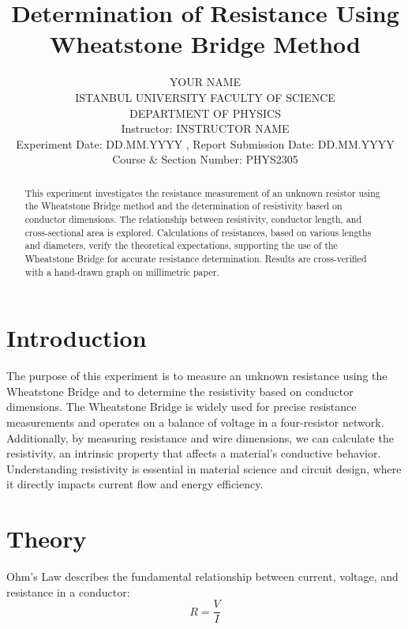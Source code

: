\documentclass[journal]{IEEEtran}
\begin{document}
\title{Determination of Resistance Using Wheatstone Bridge Method}
\author{YOUR NAME\\
ISTANBUL UNIVERSITY FACULTY OF SCIENCE\\
DEPARTMENT OF PHYSICS\\
Instructor: INSTRUCTOR NAME\\
Experiment Date: DD.MM.YYYY , Report Submission Date: DD.MM.YYYY\\
Course \& Section Number: PHYS2305}

\maketitle

\begin{abstract}
    This experiment investigates the resistance measurement of an unknown resistor using the Wheatstone Bridge method and the determination of resistivity based on conductor dimensions. The relationship between resistivity, conductor length, and cross-sectional area is explored. Calculations of resistances, based on various lengths and diameters, verify the theoretical expectations, supporting the use of the Wheatstone Bridge for accurate resistance determination. Results are cross-verified with a hand-drawn graph on millimetric paper.
\end{abstract}
    

\section{Introduction}
The purpose of this experiment is to measure an unknown resistance using the Wheatstone Bridge and to determine the resistivity based on conductor dimensions. The Wheatstone Bridge is widely used for precise resistance measurements and operates on a balance of voltage in a four-resistor network. Additionally, by measuring resistance and wire dimensions, we can calculate the resistivity, an intrinsic property that affects a material's conductive behavior. Understanding resistivity is essential in material science and circuit design, where it directly impacts current flow and energy efficiency.
\section{Theory}
Ohm’s Law describes the fundamental relationship between current, voltage, and resistance in a conductor:
\begin{equation}
    R = \frac{V}{I}
    \label{eq:ohmslaw}
\end{equation}
\end{document}
